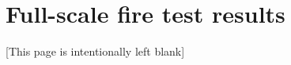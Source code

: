 \documentclass[twoside,openright,12pt]{book}
\makeatletter
\newcounter{savepage}
\def\cleardoublepage{\clearpage%
	\if@twoside
	\ifodd\c@page\else
	\vspace*{\fill}
	\hfill
	\begin{center}
		[This page is intentionally left blank]
	\end{center}
	\vspace{\fill}
	\thispagestyle{empty}
	\newpage
	\if@twocolumn\hbox{}\newpage\fi
	\fi
	\fi
}
\makeatother
\begin{document}
\chapter{Full-scale fire test results}
\label{app:fire-test}       


\cleardoublepage

\setcounter{page}{\thesavepage}
\printbibliography[heading=bibintoc]

% 
% 

\end{document}
